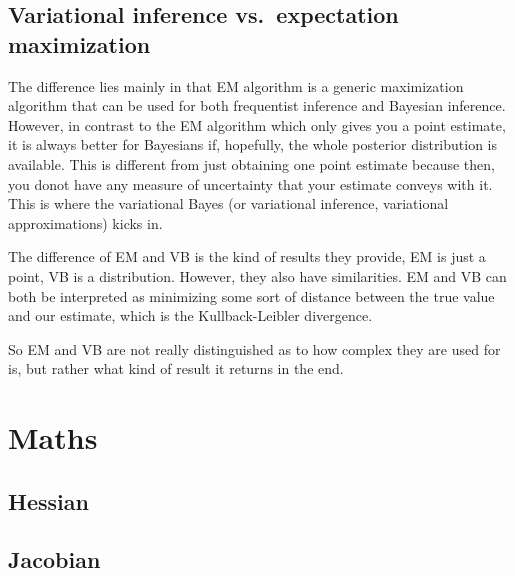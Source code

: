 \documentclass{book}
\begin{document}
\section{Variational inference vs.\ expectation maximization}
The difference lies mainly in that EM algorithm is a generic maximization algorithm that can be used for both frequentist inference and Bayesian inference. However, in contrast to the EM algorithm which only gives you a point estimate, it is always better for Bayesians if, hopefully, the whole posterior distribution is available. This is different from just obtaining one point estimate because then, you donot have any measure of uncertainty that your estimate conveys with it. This is where the variational Bayes (or variational inference, variational approximations) kicks in.

The difference of EM and VB is the kind of results they provide, EM is just a point, VB is a distribution. However, they also have similarities. EM and VB can both be interpreted as minimizing some sort of distance between the true value and our estimate, which is the Kullback-Leibler divergence.

So EM and VB are not really distinguished as to how complex they are used for is, but rather what kind of result it returns in the end.

\chapter{Maths}

\section{Hessian}

\section{Jacobian}

\newpage
\renewcommand{\cftchapdotsep}{\cftdotsep}
\tableofcontents


\newpage

 
\end{document}
